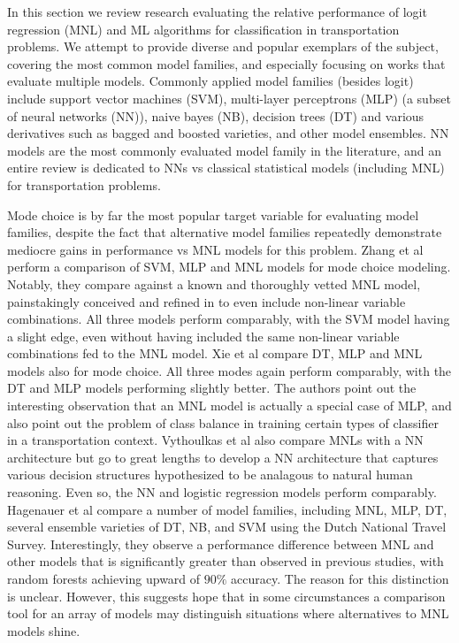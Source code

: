 \documentclass[numbered]{trbunofficial}
\begin{document}
In this section we review research evaluating the relative performance of logit regression (MNL) and ML algorithms for classification in transportation problems.
 We attempt to provide diverse and popular exemplars of the subject, covering the most common model families, and especially focusing on works that evaluate multiple models.
 Commonly applied model families (besides logit) include support vector machines (SVM), multi-layer perceptrons (MLP) (a subset of neural networks (NN)), naive bayes (NB), decision trees (DT) and various derivatives such as bagged and boosted varieties, and other model ensembles.
 NN models are the most commonly evaluated model family in the literature, and an entire review  is dedicated to NNs vs classical statistical models (including MNL) for transportation problems.

Mode choice is by far the most popular target variable for evaluating model families, despite the fact that alternative model families repeatedly demonstrate mediocre gains in performance vs MNL models for this problem.
 Zhang et al  perform a comparison of SVM, MLP and MNL models for mode choice modeling.
 Notably, they compare against a known and thoroughly vetted MNL model, painstakingly conceived and refined in  to even include non-linear variable combinations.
 All three models perform comparably, with the SVM model having a slight edge, even without having included the same non-linear variable combinations fed to the MNL model.
 Xie et al  compare DT, MLP and MNL models also for mode choice.
 All three modes again perform comparably, with the DT and MLP models performing slightly better.
 The authors point out the interesting observation that an MNL model is actually a special case of MLP, and also point out the problem of class balance in training certain types of classifier in a transportation context.
 Vythoulkas et al  also compare MNLs with a NN architecture but go to great lengths to develop a NN architecture that captures various decision structures hypothesized to be analagous to natural human reasoning.
 Even so, the NN and logistic regression models perform comparably.
 Hagenauer et al  compare a number of model families, including MNL, MLP, DT, several ensemble varieties of DT, NB, and SVM using the Dutch National Travel Survey.
 Interestingly, they observe a performance difference between MNL and other models that is significantly greater than observed in previous studies, with random forests achieving upward of $90\%$ accuracy.
 The reason for this distinction is unclear.
 However, this suggests hope that in some circumstances a comparison tool for an array of models may distinguish situations where alternatives to MNL models shine.
\end{document}
